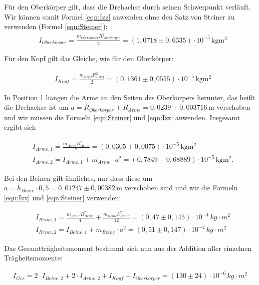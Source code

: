 Für den Oberkörper gilt, dass die Drehachse durch seinen Schwerpunkt verläuft. Wir können somit Formel \ref{eqn:Izz} anwenden ohne den 
Satz von Steiner zu verwenden (Formel \ref{eqn:Steiner}):
\begin{align*}
  & I_{Oberk\ddot{o}rper} = \frac{m_{Oberk\ddot{o}rper}R_{Oberk\ddot{o}rper}^2}{2} = (1{,}0718 \pm 0{,}6335) \cdot 10^{-5} \, \mathrm{kgm^2}
\end{align*}

Für den Kopf gilt das Gleiche, wie für den Oberkörper:

\begin{align*}
  & I_{Kopf} = \frac{m_{Kopf}R_{Kopf}^2}{2} = (0{,}1361 \pm 0{,}0555) \cdot 10^{-5} \, \mathrm{kgm^2}
\end{align*}

In Position 1 hängen die Arme an den Seiten des Oberkörpers herunter, das heißt die Drehachse ist um $a = R_{Oberk\ddot{o}rper} + R_{Arme} = 0{,}0239 \pm 0{,}003716 \, \mathrm{m}$
verschoben und wir müssen die Formeln \ref{eqn:Steiner} und \ref{eqn:Izz} anwenden. Insgesamt ergibt sich

\begin{align*}
  & I_{Arme,1} = \frac{m_{Arme}R_{Arme}^2}{2} = (0{,}0305 \pm 0{,}0075) \cdot 10^{-5} \, \mathrm{kgm^2} \\
  & I_{Arme,2} = I_{Arme,1} + m_{Arme} \cdot a^2 = (0{,}7849 \pm 0{,}68889) \cdot 10^{-5} \, \mathrm{kgm^2}.
\end{align*}

Bei den Beinen gilt ähnliches, nur dass diese um $a = h_{Beine} \cdot 0{,}5 = 0{,}01247 \pm 0{,}00382 \, \mathrm{m}$ verschoben sind
und wir die Formeln \ref{eqn:Izx} und \ref{eqn:Steiner} verwenden:

\begin{align*}
  & I_{Beine,1} = \frac{m_{Beine}R_{Beine}^2}{4} + \frac{m_{Beine}h_{Beine}^2}{12} = (0,47 \pm 0,145) \cdot 10^{-4} \, kg \cdot m^2 \\
  & I_{Beine,2} = I_{Beine,1} + m_{Beine} \cdot a^2 = (0,51 \pm 0,147) \cdot 10^{-4} \, kg \cdot m^2
\end{align*}

Das Gesamtträgheitsmoment bestimmt sich nun aus der Addition aller einzelnen Trägheitsmomente:

\begin{align}
  I_{Ges} = 2 \cdot I_{Beine,2} + 2 \cdot I_{Arme,2} + I_{Kopf} + I_{Oberk\ddot{o}rper} = (130 \pm 24)\cdot 10^{-6} \, kg \cdot m^2
\end{align}

